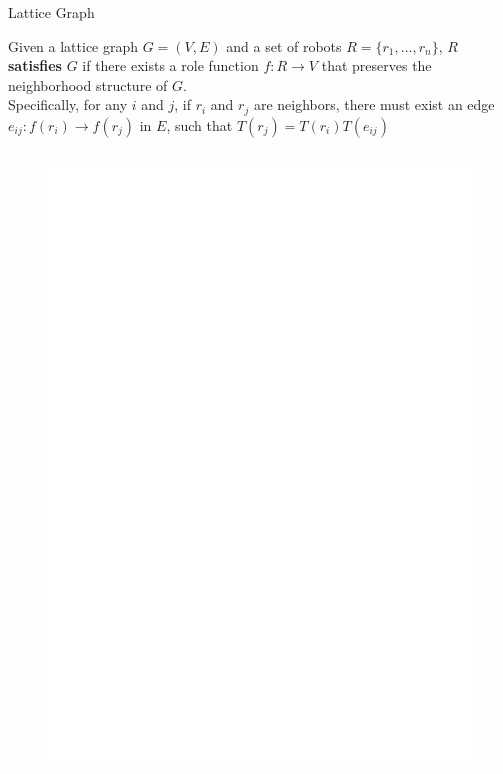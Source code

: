 \documentclass[10pt]{beamer}
\newcommand{\edge}[3]{{#1}\overset{#2}{\longrightarrow}{#3}}
\begin{document}
\begin{frame}{Lattice Graph}
  \begin{block}{}
    \small{Given a lattice graph $G=(V, E)$ and a set of robots $R = \{
    r_1, \ldots, r_n \}$, $R$ \textbf{satisfies} $G$ if
    there exists a role function $f: R \rightarrow V$ that preserves
    the neighborhood structure of $G$.
    \\
    Specifically, for any $i$ and $j$, if $r_i$ and $r_j$ are neighbors, 
    there must exist an edge
    $e_{ij}: \edge{f(r_i)}{}{f(r_j)}$ in $E$, such that
    $ T(r_j) = T(r_i) T(e_{ij})$}
  \begin{columns}[T] 
    \begin{column}{.4\textwidth}
      \begin{figure}
        \centering
        \includegraphics[scale=0.38]{figs/hex}

\end{figure}
\end{column}
\end{columns}
\end{block}
\end{frame}
\end{document}
